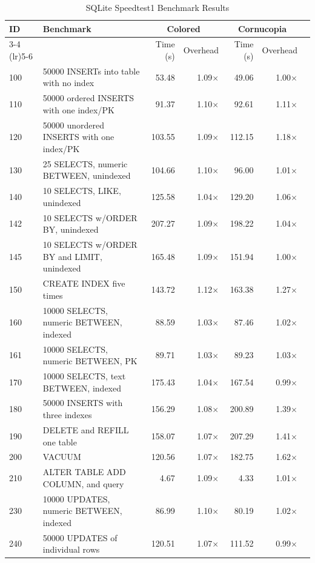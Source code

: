 \begin{table}[htbp]
\centering
\caption{SQLite Speedtest1 Benchmark Results}
\label{tab:sqlite-benchmark}
\begin{tabular}{@{}llrrrrr@{}}
\toprule
ID & Benchmark & \multicolumn{2}{c}{Colored} & \multicolumn{2}{c}{Cornucopia} \\
\cmidrule(lr){3-4} \cmidrule(lr){5-6}
 & & Time (s) & Overhead & Time (s) & Overhead \\
\midrule
100 & 50000 INSERTs into table with no index & 53.48 & 1.09$\times$ & 49.06 & 1.00$\times$ \\
110 & 50000 ordered INSERTS with one index/PK & 91.37 & 1.10$\times$ & 92.61 & 1.11$\times$ \\
120 & 50000 unordered INSERTS with one index/PK & 103.55 & 1.09$\times$ & 112.15 & 1.18$\times$ \\
130 & 25 SELECTS, numeric BETWEEN, unindexed & 104.66 & 1.10$\times$ & 96.00 & 1.01$\times$ \\
140 & 10 SELECTS, LIKE, unindexed & 125.58 & 1.04$\times$ & 129.20 & 1.06$\times$ \\
142 & 10 SELECTS w/ORDER BY, unindexed & 207.27 & 1.09$\times$ & 198.22 & 1.04$\times$ \\
145 & 10 SELECTS w/ORDER BY and LIMIT, unindexed & 165.48 & 1.09$\times$ & 151.94 & 1.00$\times$ \\
150 & CREATE INDEX five times & 143.72 & 1.12$\times$ & 163.38 & 1.27$\times$ \\
160 & 10000 SELECTS, numeric BETWEEN, indexed & 88.59 & 1.03$\times$ & 87.46 & 1.02$\times$ \\
161 & 10000 SELECTS, numeric BETWEEN, PK & 89.71 & 1.03$\times$ & 89.23 & 1.03$\times$ \\
170 & 10000 SELECTS, text BETWEEN, indexed & 175.43 & 1.04$\times$ & 167.54 & 0.99$\times$ \\
180 & 50000 INSERTS with three indexes & 156.29 & 1.08$\times$ & 200.89 & 1.39$\times$ \\
190 & DELETE and REFILL one table & 158.07 & 1.07$\times$ & 207.29 & 1.41$\times$ \\
200 & VACUUM & 120.56 & 1.07$\times$ & 182.75 & 1.62$\times$ \\
210 & ALTER TABLE ADD COLUMN, and query & 4.67 & 1.09$\times$ & 4.33 & 1.01$\times$ \\
230 & 10000 UPDATES, numeric BETWEEN, indexed & 86.99 & 1.10$\times$ & 80.19 & 1.02$\times$ \\
240 & 50000 UPDATES of individual rows & 120.51 & 1.07$\times$ & 111.52 & 0.99$\times$ \\

\end{tabular}
\end{table}
